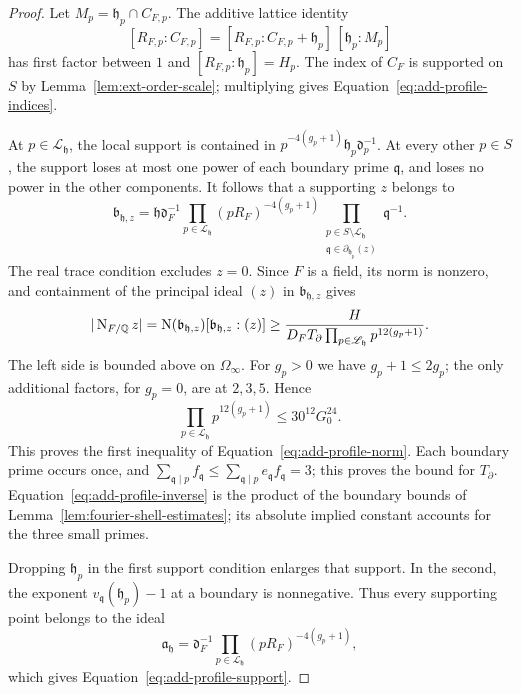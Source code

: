 \begin{proof}
Let \(M_p=\mathfrak h_p\cap C_{F,p}\).  The additive lattice identity
\[
 [R_{F,p}:C_{F,p}]
   =[R_{F,p}:C_{F,p}+\mathfrak h_p]\,[\mathfrak h_p:M_p]
\]
has first factor between \(1\) and
\([R_{F,p}:\mathfrak h_p]=H_p\).  The index of \(C_F\) is supported on \(S\)
by Lemma~\ref{lem:ext-order-scale}; multiplying gives
Equation~\eqref{eq:add-profile-indices}.

At \(p\in\mathscr L_{\mathfrak h}\), the local support is contained in
\(p^{-4(g_p+1)}\mathfrak h_p\mathfrak d_p^{-1}\).
At every other \(p\in S\), the support loses at most one power of each
boundary prime \(\mathfrak q\), and loses no power in the other components.
It follows that a supporting \(z\) belongs to
\[
 \mathfrak b_{\mathfrak h,z}
  =\mathfrak h\mathfrak d_F^{-1}
     \prod_{p\in\mathscr L_{\mathfrak h}}
           (pR_F)^{-4(g_p+1)}
     \prod_{\substack{p\in S\setminus\mathscr L_{\mathfrak h}\\
                      \mathfrak q\in\partial_{\mathfrak h_p}(z)}}
           \mathfrak q^{-1}.
\]
The real trace condition excludes \(z=0\).  Since \(F\) is a field, its norm
is nonzero, and containment of the principal ideal \((z)\) in
\(\mathfrak b_{\mathfrak h,z}\) gives
\[
 |\operatorname{N}_{F/\mathbb Q}z|
   =\operatorname{N}(\mathfrak b_{\mathfrak h,z})
        [\mathfrak b_{\mathfrak h,z}:(z)]
   \ge \frac{H}
      {D_FT_\partial\prod_{p\in\mathscr L_{\mathfrak h}}p^{12(g_p+1)}}.
\]
The left side is bounded above on \(\Omega_\infty\).  For \(g_p>0\) we have
\(g_p+1\le2g_p\); the only additional factors, for \(g_p=0\), are at
\(2,3,5\).  Hence
\[
 \prod_{p\in\mathscr L_{\mathfrak h}}p^{12(g_p+1)}
       \le30^{12}G_0^{24}.
\]
This proves the first inequality of Equation~\eqref{eq:add-profile-norm}.
Each boundary prime occurs once, and
\(\sum_{\mathfrak q\mid p}f_{\mathfrak q}\le
\sum_{\mathfrak q\mid p}e_{\mathfrak q}f_{\mathfrak q}=3\);
this proves the bound for \(T_\partial\).  Equation~\eqref{eq:add-profile-inverse}
is the product of the boundary bounds of
Lemma~\ref{lem:fourier-shell-estimates}; its absolute implied constant
accounts for the three small primes.

Dropping \(\mathfrak h_p\) in the first support condition enlarges that
support.  In the second, the exponent \(v_{\mathfrak q}(\mathfrak h_p)-1\)
at a boundary is nonnegative.  Thus every supporting
point belongs to the ideal
\[
 \mathfrak a_{\mathfrak h}
   =\mathfrak d_F^{-1}
      \prod_{p\in\mathscr L_{\mathfrak h}}
             (pR_F)^{-4(g_p+1)} ,
\]
which gives Equation~\eqref{eq:add-profile-support}.


\end{proof}
